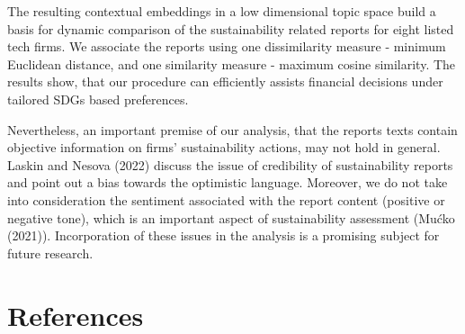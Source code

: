 \documentclass[
]{article}
\begin{document}
The resulting contextual embeddings in a low dimensional topic space build a basis for dynamic comparison of the sustainability related reports for eight listed tech firms. We associate the reports using one dissimilarity measure - minimum Euclidean distance, and one similarity measure - maximum cosine similarity. The results show, that our procedure can efficiently assists financial decisions under tailored SDGs based preferences.

Nevertheless, an important premise of our analysis, that the reports texts contain objective information on firms' sustainability actions, may not hold in general. Laskin and Nesova (2022) discuss the issue of credibility of sustainability reports and point out a bias towards the optimistic language. Moreover, we do not take into consideration the sentiment associated with the report content (positive or negative tone), which is an important aspect of sustainability assessment (Mućko (2021)). Incorporation of these issues in the analysis is a promising subject for future research.

\hypertarget{references}{%
\section*{References}\label{references}}
\end{document}
